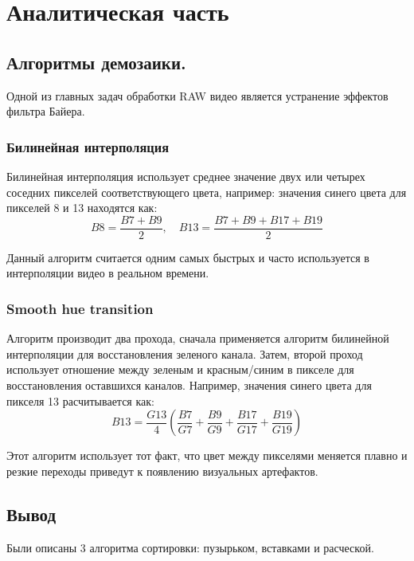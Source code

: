 \chapter{Аналитическая часть}

\section{Алгоритмы демозаики.}

Одной из главных задач обработки RAW видео является устранение эффектов фильтра Байера.


\subsection{Билинейная интерполяция}
Билинейная интерполяция использует среднее значение двух или четырех соседних пикселей соответствующего цвета, например: значения синего цвета для пикселей 8 и 13 находятся как:
\begin{equation}
	B8 = \frac{B7 + B9}{2},
	\quad	
	B13 = \frac{B7 + B9 + B17 + B19}{2}
\end{equation}

Данный алгоритм считается одним самых быстрых и часто используется в интерполяции видео в реальном времени.

\subsection{Smooth hue transition}

Алгоритм производит два прохода, сначала применяется алгоритм билинейной интерполяции для восстановления зеленого канала. Затем, второй проход использует отношение между зеленым и красным/синим в пикселе для восстановления оставшихся каналов. Например, значения синего цвета для пикселя 13 расчитывается как:
\begin{equation}	
	B13 = \frac{G13}{4}(\frac{B7}{G7} + \frac{B9}{G9} + \frac{B17}{G17} + \frac{B19}{G19})
\end{equation}

Этот алгоритм использует тот факт, что цвет между пикселями меняется плавно и резкие переходы приведут к появлению визуальных артефактов.

\section*{Вывод}
Были описаны 3 алгоритма сортировки: пузырьком, вставками и расческой.
